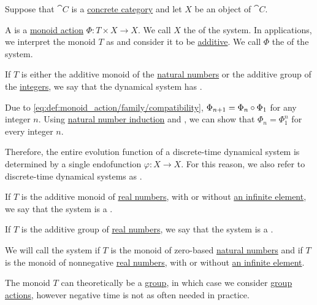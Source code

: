 \begin{definition}\label{def:dynamical_system}\mimprovised
  Suppose that \( \cat{C} \) is a \hyperref[def:concrete_category]{concrete category} and let \( X \) be an object of \( \cat{C} \).

  A  is a \hyperref[def:monoid_action]{monoid action} \( \Phi: T \times X \to X \). We call \( X \) the  of the system. In applications, we interpret the monoid \( T \) as  and consider it to be \hyperref[rem:additive_magma]{additive}. We call \( \Phi \) the  of the system.

  \begin{thmenum}
     If \( T \) is either the additive monoid of the \hyperref[def:natural_numbers]{natural numbers} or the additive group of the \hyperref[def:integers]{integers}, we say that the dynamical system has .

    Due to \eqref{eq:def:monoid_action/family/compatibility}, \( \Phi_{n+1} = \Phi_n \bincirc \Phi_1 \) for any integer \( n \). Using \hyperref[rem:induction/peano_arithmetic]{natural number induction} and , we can show that \( \Phi_n = \Phi_1^n \) for every integer \( n \).

    Therefore, the entire evolution function of a discrete-time dynamical system is determined by a single endofunction \( \varphi: X \to X \). For this reason, we also refer to discrete-time dynamical systems as .

     If \( T \) is the additive monoid of \hyperref[def:real_numbers]{real numbers}, with or without \hyperref[def:extended_real_numbers]{an infinite element}, we say that the system is a .

     If \( T \) is the additive group of \hyperref[def:real_numbers]{real numbers}, we say that the system is a .
  \end{thmenum}

  We will call the system  if \( T \) is the monoid of zero-based \hyperref[def:natural_numbers]{natural numbers} and  if \( T \) is the monoid of nonnegative \hyperref[def:real_numbers]{real numbers}, with or without \hyperref[def:extended_real_numbers]{an infinite element}.

  The monoid \( T \) can theoretically be a \hyperref[def:group]{group}, in which case we consider \hyperref[def:group_action]{group actions}, however negative time is not as often needed in practice.
\end{definition}


